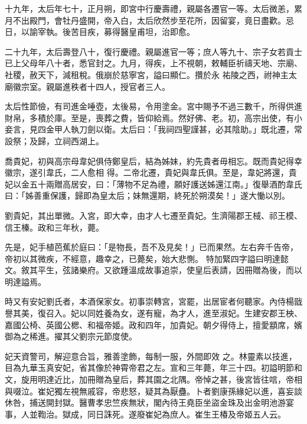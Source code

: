 \begin{pinyinscope}
 十九年，太后年七十，正月朔，即宮中行慶壽禮，親屬各遷官一等。太后微恙，累月不出殿門，會牡丹盛開，帝入白，太后欣然步至花所，因留宴，竟日盡歡。忌日，以諭宰執。後苦目疾，募得醫皇甫坦，治即愈。



 二十九年，太后壽登八十，復行慶禮。親屬進官一等；庶人等九十、宗子女若貢士已上父母年八十者，悉官封之。九月，得疾，上不視朝，敕輔臣祈禱天地、宗廟、社稷，赦天下，減租稅。俄崩於慈寧宮，謚曰顯仁。攢於永
 祐陵之西，祔神主太廟徽宗室。親屬進秩者十四人，授官者三人。



 太后性節儉，有司進金唾壺，太後易，令用塗金。宮中賜予不過三數千，所得供進財帛，多積於庫。至是，喪葬之費，皆仰給焉。然好佛、老。初，高宗出使，有小妾言，見四金甲人執刀劍以衛。太后曰：「我祠四聖謹甚，必其陰助。」既北遷，常設祭；及歸，立祠西湖上。



 喬貴妃，初與高宗母韋妃俱侍鄭皇后，結為姊妹，約先貴者毋相忘。既而貴妃得幸徽宗，遂引韋氏，二人愈相
 得。二帝北遷，貴妃與韋氏俱。至是，韋妃將還，貴妃以金五十兩贈高居安，曰：「薄物不足為禮，願好護送姊還江南。」復舉酒酌韋氏曰：「姊善重保護，歸即為皇太后；妹無還期，終死於朔漠矣！」遂大慟以別。



 劉貴妃，其出單微。入宮，即大幸，由才人七遷至貴妃。生濟陽郡王棫、祁王模、信王榛。政和三年秋，薨。



 先是，妃手植芭蕉於庭曰：「是物長，吾不及見矣！」已而果然。左右奔千告帝，帝初以其微疾，不經意，趣幸之，已薨矣，始大悲惻。
 特加緊四字謚曰明達懿文。敘其平生，弦諸樂府。又欲踵溫成故事追崇，使皇后表請，因冊贈為後，而以明達謚焉。



 時又有安妃劉氏者，本酒保家女。初事崇轉宮，宮罷，出居宦者何聽家。內侍楊戩譽其美，復召入。妃以同姓養為女，遂有寵，為才人，進至淑妃。生建安郡王柍、嘉國公椅、英國公楒、和福帝姬。政和四年，加貴妃。朝夕得侍上，擅愛顓席，嬪御為之稀進。擢其父劉宗元節度使。



 妃天資警司，解迎意合旨，雅善塗飾，每制一服，外間即效
 之。林靈素以技進，目為九華玉真安妃，省其像於神霄帝君之左。宣和三年薨，年三十四。初謚明節和文，旋用明達近比，加冊贈為皇后，葬其園之北隅。帝悼之甚，後宮皆往唁，帝相與啜泣。崔妃獨左視無戚容，帝悲怒，疑其為厭蠱。卜者劉康孫緣妃以進，喜妄談休咎，捕送開封獄。醫曹孝忠竺疾無狀，閣內待王堯臣坐盜金珠及出金明池游宴事，人並鞫治。獄成，同日誅死。遂廢崔妃為庶人。崔生王椿及帝姬五人云。




\end{pinyinscope}
